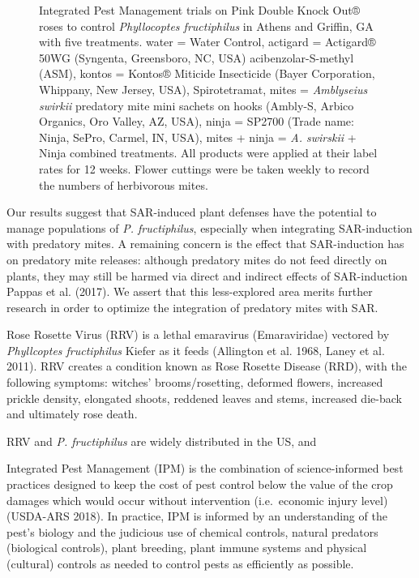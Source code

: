 \documentclass[12pt,final,CPage]{ufthesis}
\begin{document}
{\begin{figure}
  \caption{Integrated Pest Management trials on Pink Double Knock Out® roses to control \textit{Phyllocoptes fructiphilus} in Athens and Griffin, GA with five treatments. water = Water Control, actigard = Actigard® 50WG (Syngenta, Greensboro, NC, USA) acibenzolar-S-methyl (ASM),  kontos = Kontos® Miticide Insecticide (Bayer Corporation, Whippany, New Jersey, USA), Spirotetramat, mites = \textit{Amblyseius swirkii} predatory mite mini sachets on hooks (Ambly-S, Arbico Organics, Oro Valley, AZ, USA), ninja = SP2700 (Trade name: Ninja\texttrademark, SePro, Carmel, IN, USA), mites + ninja = \textit{A. swirskii} + Ninja combined treatments. All products were applied at their label rates for 12 weeks. Flower cuttings were be taken weekly to record the numbers of herbivorous mites.}\label{fig:ipm}
  \end{figure}
  Our results suggest that SAR-induced plant defenses have the potential to manage populations of \emph{P. fructiphilus}, especially when integrating SAR-induction with predatory mites. A remaining concern is the effect that SAR-induction has on predatory mite releases: although predatory mites do not feed directly on plants, they may still be harmed via direct and indirect effects of SAR-induction Pappas et al. (2017). We assert that this less-explored area merits further research in order to optimize the integration of predatory mites with SAR.

  Rose Rosette Virus (RRV) is a lethal emaravirus (Emaraviridae) vectored by \emph{Phyllcoptes fructiphilus} Kiefer as it feeds (Allington et al. 1968, Laney et al. 2011). RRV creates a condition known as Rose Rosette Disease (RRD), with the following symptoms: witches' brooms/rosetting, deformed flowers, increased prickle density, elongated shoots, reddened leaves and stems, increased die-back and ultimately rose death.

  RRV and \emph{P. fructiphilus} are widely distributed in the US, and

  Integrated Pest Management (IPM) is the combination of science-informed best practices designed to keep the cost of pest control below the value of the crop damages which would occur without intervention (i.e.~economic injury level) (USDA-ARS 2018). In practice, IPM is informed by an understanding of the pest's biology and the judicious use of chemical controls, natural predators (biological controls), plant breeding, plant immune systems and physical (cultural) controls as needed to control pests as efficiently as possible.

}
\end{document}
